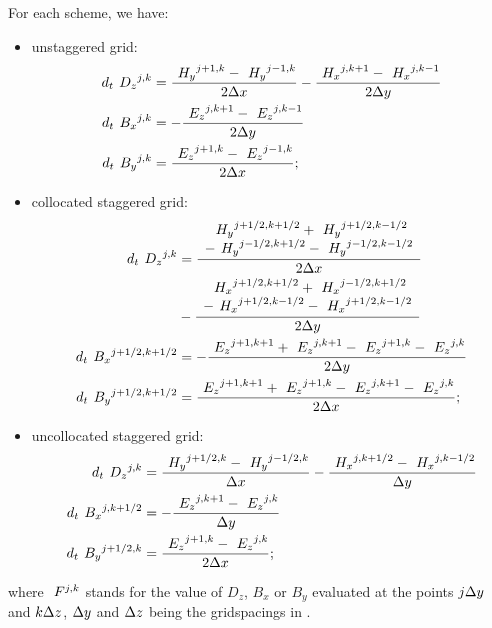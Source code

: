 For each scheme, we have:
\begin{itemize}
\item
  unstaggered grid:
  \begin{equation} \label{eqn:fourier_unstaggered} \begin{split}
  d_t {\ }^{}{D_z}^{j,k} & = \frac{{\ }^{}{H_y}^{j+1,k} -
  {\ }^{}{H_y}^{j-1,k}}{2\Delta x} - \frac{{\ }^{}{H_x}^{j,k+1} -
  {\ }^{}{H_x}^{j,k-1}}{2\Delta y} \\
  d_t {\ }^{}{B_x}^{j,k} & = - \frac{{\ }^{}{E_z}^{j,k+1} -
  {\ }^{}{E_z}^{j,k-1}}{2\Delta y} \\
  d_t {\ }^{}{B_y}^{j,k} & = \frac{{\ }^{}{E_z}^{j+1,k} -
  {\ }^{}{E_z}^{j-1,k}}{2\Delta x} ;
  \end{split} \end{equation}
\item
  collocated staggered grid:
  \begin{equation} \label{eqn:fourier_collocated_staggered} \begin{split}
  d_t {\ }^{}{D_z}^{j,k} & =
  \frac{\begin{array}{c}
      {\ }^{}{H_y}^{j+1/2,k+1/2} + {\ }^{}{H_y}^{j+1/2,k-1/2} \\
      - {\ }^{}{H_y}^{j-1/2,k+1/2} - {\ }^{}{H_y}^{j-1/2,k-1/2}
    \end{array}}{2\Delta x} \\
  & - \frac{\begin{array}{c}
      {\ }^{}{H_x}^{j+1/2,k+1/2} + {\ }^{}{H_x}^{j-1/2,k+1/2} \\
      - {\ }^{}{H_x}^{j+1/2,k-1/2} - {\ }^{}{H_x}^{j+1/2,k-1/2}
  \end{array}}{2\Delta y} \\
  d_t {\ }^{}{B_x}^{j+1/2,k+1/2} & = - \frac{{\ }^{}{E_z}^{j+1,k+1} +
  {\ }^{}{E_z}^{j,k+1} - {\ }^{}{E_z}^{j+1,k} -
  {\ }^{}{E_z}^{j,k}}{2\Delta y} \\
  d_t {\ }^{}{B_y}^{j+1/2,k+1/2} & = \frac{{\ }^{}{E_z}^{j+1,k+1} +
  {\ }^{}{E_z}^{j+1,k} - {\ }^{}{E_z}^{j,k+1} -
  {\ }^{}{E_z}^{j,k}}{2\Delta x} ;
  \end{split} \end{equation}
\item
  uncollocated staggered grid:
  \begin{equation} \label{eqn:fourier_uncollocated_staggered} \begin{split}
  d_t {\ }^{}{D_z}^{j,k} & = \frac{{\ }^{}{H_y}^{j+1/2,k} -
  {\ }^{}{H_y}^{j-1/2,k}}{\Delta x} - \frac{{\ }^{}{H_x}^{j,k+1/2} -
  {\ }^{}{H_x}^{j,k-1/2}}{\Delta y}  \\
  d_t {\ }^{}{B_x}^{j,k+1/2} & = - \frac{{\ }^{}{E_z}^{j,k+1} -
  {\ }^{}{E_z}^{j,k}}{\Delta y} \\
  d_t {\ }^{}{B_y}^{j+1/2,k} & = \frac{{\ }^{}{E_z}^{j+1,k} -
  {\ }^{}{E_z}^{j,k}}{2\Delta x} ;
  \end{split} \end{equation}
\end{itemize}
where ${\ }^{}{F}^{j,k}$ stands for the value of $D_z$, $B_x$ or $B_y$
evaluated at the points $j \Delta y$ and $k \Delta z$, $\Delta y$ and
$\Delta z$ being the gridspacings in .

